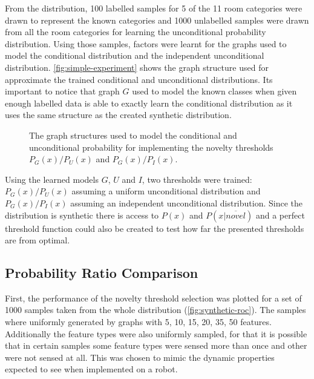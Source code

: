 \documentclass[runningheads,a4paper]{llncs}
\begin{document}
From the distribution, 100 labelled samples for 5 of the 11 room categories were
drawn to represent the known categories and 1000 unlabelled samples were drawn from
all the room categories for learning the unconditional probability distribution.
Using those samples, factors were learnt for the graphs used to model the
conditional distribution and the independent unconditional distribution.
\autoref{fig:simple-experiment} shows the graph structure used for approximate the
trained conditional and unconditional distributions.
Its important to notice that graph $G$ used to model the known classes when given
enough labelled data is able to exactly learn the conditional distribution as it
uses the same structure as the created synthetic distribution.

\begin{figure}[h]
\centering

\qquad
{}
\qquad
{}

\caption{\label{fig:simple-experiment}The graph structures used to model the
         conditional and unconditional probability for implementing the novelty
         thresholds $P_G(x)/P_U(x)$ and $P_G(x)/P_I(x)$.}
\end{figure}

Using the learned models $G$, $U$ and $I$, two thresholds were trained:
$P_G(x)/P_U(x)$ assuming a uniform unconditional distribution
and $P_G(x)/P_I(x)$ assuming an independent unconditional distribution.
Since the distribution is synthetic there is access to $P(x)$ and $P(x|\overline{novel})$
and a perfect threshold function could also be created to test how far the
presented thresholds are from optimal.

\subsection{Probability Ratio Comparison}
First, the performance of the novelty threshold selection was plotted for a set
of 1000 samples taken from the whole distribution (\autoref{fig:synthetic-roc}).
The samples where uniformly generated by graphs with 5, 10, 15, 20, 35, 50 features.
Additionally the feature types were also uniformly sampled, for that it is possible
that in certain samples some feature types were sensed more than once and other were not
sensed at all.
This was chosen to mimic
the dynamic properties expected to see when implemented on a robot.
\end{document}
